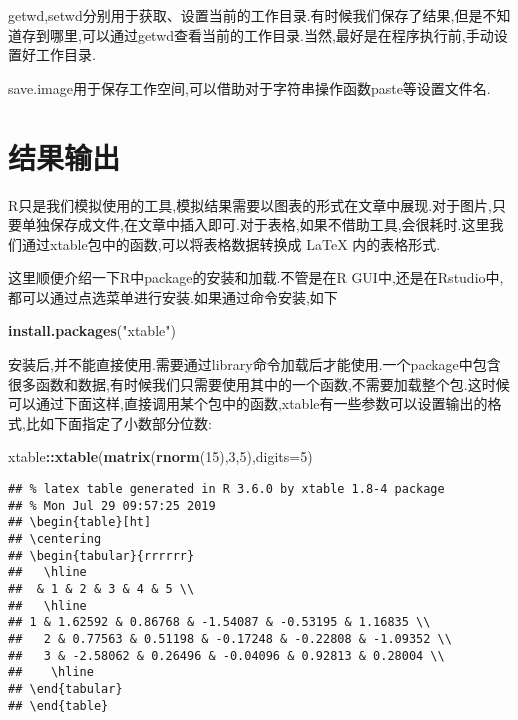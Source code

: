 \documentclass[]{ctexbook}
\newenvironment{Shaded}{\begin{snugshade}}{\end{snugshade}}
\newcommand{\DataTypeTok}[1]{\textcolor[rgb]{0.13,0.29,0.53}{#1}}
\newcommand{\DecValTok}[1]{\textcolor[rgb]{0.00,0.00,0.81}{#1}}
\newcommand{\KeywordTok}[1]{\textcolor[rgb]{0.13,0.29,0.53}{\textbf{#1}}}
\newcommand{\NormalTok}[1]{#1}
\newcommand{\OperatorTok}[1]{\textcolor[rgb]{0.81,0.36,0.00}{\textbf{#1}}}
\newcommand{\StringTok}[1]{\textcolor[rgb]{0.31,0.60,0.02}{#1}}
\begin{document}
getwd,setwd分别用于获取、设置当前的工作目录.有时候我们保存了结果,但是不知道存到哪里,可以通过getwd查看当前的工作目录.当然,最好是在程序执行前,手动设置好工作目录.

save.image用于保存工作空间,可以借助对于字符串操作函数paste等设置文件名.

\hypertarget{section-7}{%
\section{结果输出}\label{section-7}}

R只是我们模拟使用的工具,模拟结果需要以图表的形式在文章中展现.对于图片,只要单独保存成文件,在文章中插入即可.对于表格,如果不借助工具,会很耗时.这里我们通过xtable包中的函数,可以将表格数据转换成 LaTeX 内的表格形式.

这里顺便介绍一下R中package的安装和加载.不管是在R GUI中,还是在Rstudio中,都可以通过点选菜单进行安装.如果通过命令安装,如下

\begin{Shaded}
\begin{Highlighting}[]
\KeywordTok{install.packages}\NormalTok{(}\StringTok{"xtable"}\NormalTok{)}
\end{Highlighting}
\end{Shaded}

安装后,并不能直接使用.需要通过library命令加载后才能使用.一个package中包含很多函数和数据,有时候我们只需要使用其中的一个函数,不需要加载整个包.这时候可以通过下面这样,直接调用某个包中的函数,xtable有一些参数可以设置输出的格式,比如下面指定了小数部分位数:

\begin{Shaded}
\begin{Highlighting}[]
\NormalTok{xtable}\OperatorTok{::}\KeywordTok{xtable}\NormalTok{(}\KeywordTok{matrix}\NormalTok{(}\KeywordTok{rnorm}\NormalTok{(}\DecValTok{15}\NormalTok{),}\DecValTok{3}\NormalTok{,}\DecValTok{5}\NormalTok{),}\DataTypeTok{digits=}\DecValTok{5}\NormalTok{)}
\end{Highlighting}
\end{Shaded}

\begin{verbatim}
## % latex table generated in R 3.6.0 by xtable 1.8-4 package
## % Mon Jul 29 09:57:25 2019
## \begin{table}[ht]
## \centering
## \begin{tabular}{rrrrrr}
##   \hline
##  & 1 & 2 & 3 & 4 & 5 \\ 
##   \hline
## 1 & 1.62592 & 0.86768 & -1.54087 & -0.53195 & 1.16835 \\ 
##   2 & 0.77563 & 0.51198 & -0.17248 & -0.22808 & -1.09352 \\ 
##   3 & -2.58062 & 0.26496 & -0.04096 & 0.92813 & 0.28004 \\ 
##    \hline
## \end{tabular}
## \end{table}
\end{verbatim}
\end{document}
